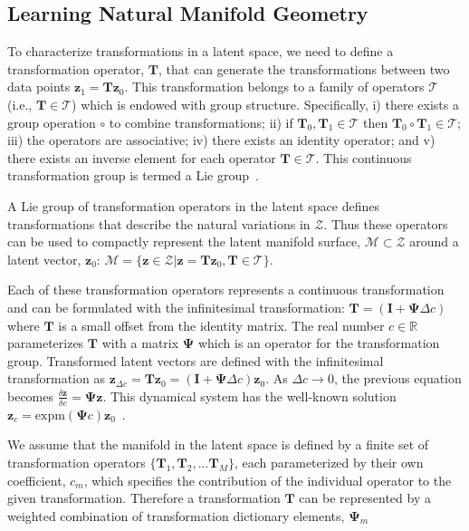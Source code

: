\documentclass[letterpaper]{article} %
\newcommand{\mtx}[1]{\ensuremath{\mathbf{#1}}}
\newcommand{\vtr}[1]{\ensuremath{\mathbf{#1}}}
\begin{document}
\subsection{Learning Natural Manifold Geometry}\label{sec:lieOpt}
To characterize transformations in a latent space, we need to define a transformation operator, $\mtx{T}$, that can generate the transformations between two data points $\vtr{z}_1 = \mtx{T}\vtr{z}_0$. This transformation belongs to a family of operators $\mathcal{T}$ (i.e., $\mtx{T} \in \mathcal{T}$) which is endowed with group structure. Specifically, i) there exists a group operation $\circ$ to combine transformations; ii) if $\mtx{T}_0, \mtx{T}_1 \in \mathcal{T}$ then $\mtx{T}_0 \circ \mtx{T}_1 \in \mathcal{T}$; iii) the operators are associative; iv) there exists an identity operator; and v) there exists an inverse element for each operator $\mtx{T} \in \mathcal{T}$. This continuous transformation group is termed a Lie group~\cite{boothby1986introduction}.

A Lie group of transformation operators in the latent space defines transformations that describe the natural variations in $\mathcal{Z}$. Thus these operators can be used to compactly represent the latent manifold surface, $\mathcal{M} \subset \mathcal{Z}$ around a latent vector, $\vtr{z}_0$: $\mathcal{M} = \{\vtr{z} \in \mathcal{Z} | \vtr{z} = \mtx{T}\vtr{z}_0, \mtx{T} \in \mathcal{T}\}$.

Each of these transformation operators represents a continuous transformation and can be formulated with the infinitesimal transformation: $\mtx{T} = (\mtx{I} + \mtx{\Psi}\Delta c)$ where $\mtx{T}$ is a small offset from the identity matrix. The real number $c \in \mathbb{R}$ parameterizes $\mtx{T}$ with a matrix $\mtx{\Psi}$ which is an operator for the transformation group. Transformed latent vectors are defined with the infinitesimal transformation as $\vtr{z}_{\Delta c} = \mtx{T}\vtr{z}_0 = (\mtx{I} + \mtx{\Psi}\Delta c)\vtr{z}_0$. As $\Delta c \rightarrow 0$, the previous equation becomes $\frac{\delta \vtr{z}}{\delta c} = \mtx{\Psi}\vtr{z}$. This dynamical system has the well-known solution $\vtr{z}_c = \mathrm{expm}(\mtx{\Psi} c)\vtr{z}_0$~\cite{rao1999learning,miao2007learning}.

We assume that the manifold in the latent space is defined by a finite set of transformation operators $\{\mtx{T}_1, \mtx{T}_2, ... \mtx{T}_M\}$, each parameterized by their own coefficient, $c_m$, which specifies the contribution of the individual operator to the given transformation. Therefore a transformation $\mtx{T}$ can be represented by a weighted combination of transformation dictionary elements, $\mtx{\Psi}_m$
\end{document}
